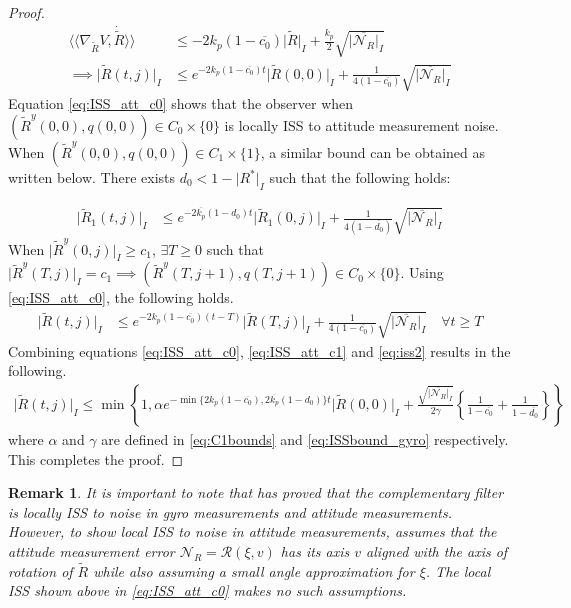 \documentclass{article}
\newtheorem{remark}{Remark}
\newcommand{\Rtilde}{\tilde{R}}
\newcommand{\normSOthree}[1]{{{\vert}#1 {\vert}_I}}
\newcommand{\expo}[1]{e^{#1}}
\newcommand{\noiseatt}{\mathcal{N}_R}
\newcommand{\maxnoiseatt}{\normSOthree{\overline{\noiseatt}}}
\newcommand{\dualpairing}[2]{\langle\langle #1 , #2 \rangle\rangle}
\newcommand{\grad}[2]{\nabla_{#1}{#2}}
\newcommand{\cobar}{\overline{c_0}}
\begin{document}
\begin{proof}
\begin{align}
    \dualpairing{\grad{\Rtilde}{V}}{\dot\Rtilde} &\leq -2k_p(1-\cobar)\normSOthree{\Rtilde} + \frac{k_p}{{2}}\sqrt{\maxnoiseatt} \nonumber\\
    \implies \normSOthree{\Rtilde(t,j)} &\leq \expo{-2k_p(1-\cobar)t}\normSOthree{\Rtilde(0,0)} + \frac{1}{4 (1-\cobar)} \sqrt{\maxnoiseatt} \label{eq:ISS_att_c0}
\end{align}
Equation \eqref{eq:ISS_att_c0} shows that the observer when ${(\Rtilde^y(0,0), q(0,0))} \in C_0\times\{0\}$ is locally ISS to attitude measurement noise. When ${(\Rtilde^y(0,0), q(0,0))}\in C_1\times\{1\}$, a similar bound can be obtained as written below. {There exists ${d_0} < 1 - \normSOthree{R^*}$} such that the following holds:

\begin{align}\label{eq:ISS_att_c1}
    \normSOthree{\Rtilde_1(t,j)} &\leq \expo{-2\overline{k_p}(1-{d_0})t}\normSOthree{\Rtilde_1(0,j)} + \frac{1}{4 (1-\overline{d_0})} \sqrt{\maxnoiseatt}
\end{align}
When $\normSOthree{\Rtilde^y(0,j)}\geq {c_1}$, $\exists T \geq 0$ such that $\normSOthree{\Rtilde^y(T,j)} = {c_1} \implies {(\Rtilde^y(T,j+1), q(T,j+1))\in C_0\times\{0\}}$. Using \eqref{eq:ISS_att_c0}, the following holds.
\begin{align}
    \normSOthree{\Rtilde(t,j)} &\leq \expo{-2k_p(1-\cobar)(t-T)}\normSOthree{\Rtilde(T,j)} + \frac{1}{4 (1-\cobar)} \sqrt{\maxnoiseatt} \quad \forall t \geq T\label{eq:iss2}
\end{align}
Combining equations \eqref{eq:ISS_att_c0}, \eqref{eq:ISS_att_c1} and \eqref{eq:iss2} results in the following.
\begin{align}
    \normSOthree{\Rtilde(t,j)} \leq \min\left\{ 1, \alpha\expo{-\min\{2k_p(1-\cobar), 2\overline{k_p}(1-{d_0})\}t}\normSOthree{\Rtilde(0,0)} + \frac{\sqrt{\maxnoiseatt}}{2\gamma}\left\{\frac{1}{1-\cobar}+\frac{1}{1-\overline{d_0}}\right\}\right\}
\end{align}
where $\alpha$ and $\gamma$ are defined in \eqref{eq:C1bounds} and \eqref{eq:ISSbound_gyro} respectively. This completes the proof. 
\end{proof}

\begin{remark}
    It is important to note that \cite{berkane_complementary} has proved that the complementary filter is locally ISS to noise in gyro measurements and attitude measurements. However, to show local ISS to noise in attitude measurements, \cite{berkane_complementary} assumes that the attitude measurement error $\noiseatt = \mathcal{R}(\xi, v)$ has its axis $v$ aligned with the axis of rotation of $\Rtilde$ while also assuming a small angle approximation for $\xi$. The local ISS shown above in \eqref{eq:ISS_att_c0} makes no such assumptions. 
\end{remark}
\end{document}
